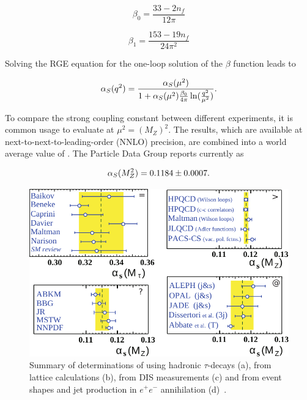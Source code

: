 \begin{equation}
\beta_0 = \frac{33-2 n_f}{12\pi}
\end{equation}

\begin{equation}
\beta_1 =\frac{153-19 n_f}{24 \pi^2}
\end{equation}

Solving the RGE equation for the one-loop solution of the $\beta$ function leads to

\begin{equation}
\alpha_S(q^2) = \frac{\alpha_S(\mu^2)}{1 + \alpha_S(\mu^2)\frac{\beta_0}{4 \pi} \ln(\frac{q^2}{\mu^2})}.
\end{equation}

To compare the strong coupling constant between different experiments, it is common usage to evaluate \as at $\mu^2= (M_Z)^2$. The results, which are available at next-to-next-to-leading-order (NNLO) precision, are combined into a world average value of \as. The Particle Data Group reports \as currently as


\begin{equation}
\alpha_S(M_Z^2) = 0.1184 \pm 0.0007.
\end{equation}


\begin{figure}[htb]
	\centering
  \includegraphics[width=1.0\textwidth]{figures/sm_model/alpha_s_measurements.pdf}
 	\caption[Determination of \asmz]{Summary of determinations of \as using hadronic $\tau$-decays (a), from lattice calculations (b), from DIS measurements (c) and from event shapes and jet production in $e^+e^-$ annihilation (d)~\cite{Beringer:1900zz}.}
\end{figure}

